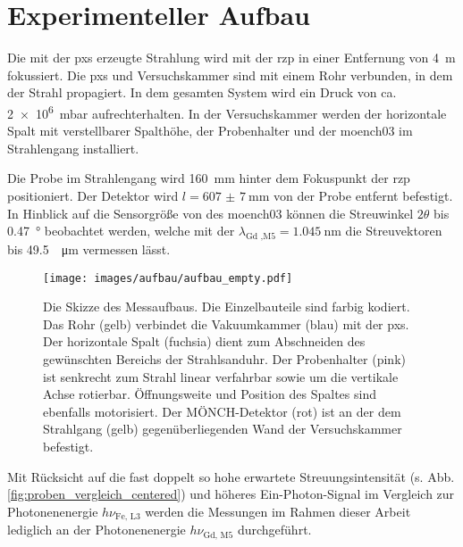 \chapter{Experimenteller Aufbau}
Die mit der \gls{pxs} erzeugte Strahlung wird mit der \gls{rzp} in einer Entfernung von \SI{4}{\meter} fokussiert. Die \gls{pxs} und Versuchskammer sind mit einem Rohr verbunden, in dem der Strahl propagiert. In dem gesamten System wird ein Druck von ca. \SI{2e6}{\milli\bar} aufrechterhalten. In der Versuchskammer werden der horizontale Spalt mit verstellbarer Spalthöhe, der Probenhalter und der \gls{moench03} im Strahlengang installiert.

\noindent
Die Probe im Strahlengang wird \SI{160}{\milli\meter} hinter dem Fokuspunkt der \gls{rzp} positioniert. Der Detektor wird $l = \SI{607(7)}{\milli\meter}$ von der Probe entfernt befestigt. In Hinblick auf die Sensorgröße von  des \gls{moench03} können die Streuwinkel $2\theta$ bis \SI{0.47}{\degree} beobachtet werden, welche mit der $\lambda_\text{Gd ,M5} = \SI{1.045}{\nano\meter}$ die Streuvektoren bis \SI{49,5}{\per\micro\meter} vermessen lässt.
\begin{figure}[H]
    \centering
    \texttt{[image: images/aufbau/aufbau\_empty.pdf]}
    \caption{Die Skizze des Messaufbaus. Die Einzelbauteile sind farbig kodiert. Das Rohr (gelb) verbindet die Vakuumkammer (blau) mit der \gls{pxs}. Der horizontale Spalt (fuchsia) dient zum Abschneiden des gewünschten Bereichs der Strahlsanduhr. Der Probenhalter (pink) ist senkrecht zum Strahl linear verfahrbar sowie um die vertikale Achse rotierbar. Öffnungsweite und Position des Spaltes sind ebenfalls motorisiert. Der MÖNCH-Detektor (rot) ist an der dem Strahlgang (gelb) gegenüberliegenden Wand der Versuchskammer befestigt.}
    \label{fig:anlage}
\end{figure}
\noindent
Mit Rücksicht auf die fast doppelt so hohe erwartete Streuungsintensität (s. Abb. \ref{fig:proben_vergleich_centered}) und höheres Ein-Photon-Signal im Vergleich zur Photonenenergie $h\nu_\text{Fe, L3}$ werden die Messungen im Rahmen dieser Arbeit lediglich an der Photonenenergie $h\nu_\text{Gd, M5}$ durchgeführt.

